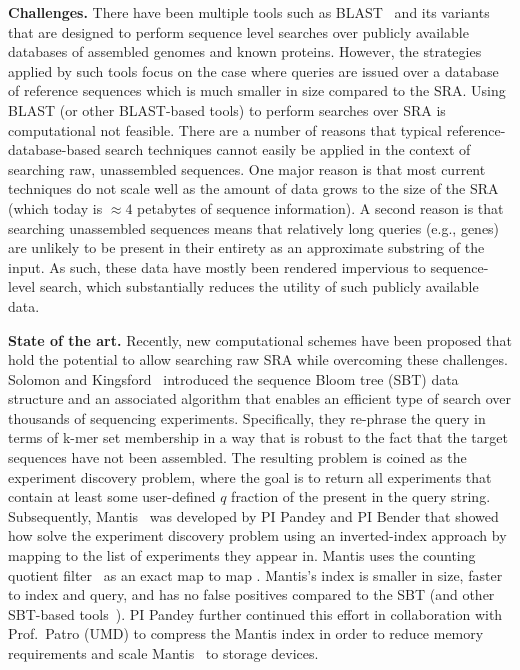 \noindent
\textbf{Challenges.}
There have been multiple tools such as BLAST~\cite{altschul1990basic} and its variants that are designed to perform sequence level searches over publicly available databases of assembled genomes and known proteins. %
However, the strategies applied by such tools focus on the case where queries are issued over a database of reference sequences which is much smaller in size compared to the SRA\@.
Using BLAST (or other BLAST-based tools) to perform searches over SRA is computational not feasible.
%
There are a number of reasons that typical reference-database-based search techniques cannot easily be applied in the context of searching raw, unassembled sequences. One major reason is that most current techniques do not scale well as the amount of data grows to the size of the SRA (which today is $\approx4$ petabytes of sequence information). A second reason is that searching unassembled sequences means that relatively long queries (e.g., genes) are unlikely to be present in their entirety as an approximate substring of the input.
As such, these data have mostly been rendered impervious to sequence-level search, which substantially reduces the utility of such publicly available data.


\noindent
\textbf{State of the art.}
Recently, new computational schemes have been proposed that hold the potential to allow searching raw SRA while overcoming these challenges. Solomon and Kingsford~\cite{solomon2016fast} introduced the sequence Bloom tree (SBT) data structure and an associated algorithm that enables an efficient type of search over thousands of sequencing experiments. Specifically, they re-phrase the query in terms of k-mer set membership in a way that is robust to the fact that the target sequences have not been assembled. The resulting problem is coined as the experiment discovery problem, where the goal is to return all experiments that contain at least some user-defined $q$ fraction of the \kmers present in the query string.
%
Subsequently, Mantis~\cite{PandeyABFJP18Cell} was developed by PI Pandey and PI Bender that showed how solve the experiment discovery problem using an inverted-index approach by mapping \kmers to the list of experiments they appear in. Mantis uses the counting quotient filter~\cite{PandeyBJP17} as an exact map to map \kmers. Mantis's index is smaller in size, faster to index and query, and has no false positives compared to the SBT (and other SBT-based tools~\cite{SolomonK17,HarrisM20,BingmannBGI19}).
%
PI Pandey further continued this effort in collaboration with Prof.\ Patro (UMD) to compress the Mantis index in order to reduce memory requirements and scale Mantis~\cite{AlmodaresiPFJP19,AlmodaresiPFJP20} to storage devices.


